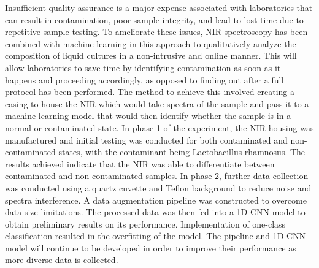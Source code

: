 \documentclass[12pt]{report}
\newcommand{\setparindent}{
    \setlength{\parskip}{1em} %
    \setlength{\parindent}{2.5em} %
}
\begin{document}
Insufficient quality assurance is a major expense associated with laboratories that can result in contamination, poor sample integrity, and lead to lost time due to repetitive sample testing. To ameliorate these issues, NIR spectroscopy has been combined with machine learning in this approach to qualitatively analyze the composition of liquid cultures in a non-intrusive and online manner. This will allow laboratories to save time by identifying contamination as soon as it happens and proceeding accordingly, as opposed to finding out after a full protocol has been performed. The method to achieve this involved creating a casing to house the NIR which would take spectra of the sample and pass it to a machine learning model that would then identify whether the sample is in a normal or contaminated state. In phase 1 of the experiment, the NIR housing was manufactured and initial testing was conducted for both contaminated and non-contaminated states, with the contaminant being Lactobacillus rhamnosus. The results achieved indicate that the NIR was able to differentiate between contaminated and non-contaminated samples. In phase 2, further data collection was conducted using a quartz cuvette and Teflon background to reduce noise and spectra interference. A data augmentation pipeline was constructed to overcome data size limitations. The processed data was then fed into a 1D-CNN model to obtain preliminary results on its performance. Implementation of one-class classification resulted in the overfitting of the model. The pipeline and 1D-CNN model will continue to be developed in order to improve their performance as more diverse data is collected.

\thispagestyle{empty}

\newpage
\tableofcontents
\thispagestyle{empty}
\newpage

\setparindent
\end{document}
